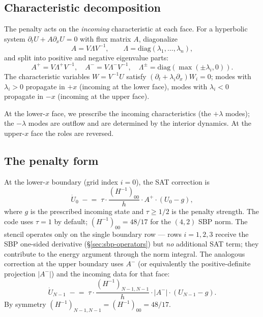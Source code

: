 \documentclass[11pt]{article}
\begin{document}
\subsection{Characteristic decomposition}
\label{sec:characteristics}

The penalty acts on the \emph{incoming} characteristic at each
face.  For a hyperbolic system $\partial_t U + A \partial_x U = 0$
with flux matrix $A$, diagonalize
\[
  A = V \Lambda V^{-1},
  \qquad \Lambda = \mathrm{diag}(\lambda_1, \ldots, \lambda_n),
\]
and split into positive and negative eigenvalue parts:
\[
  A^+ = V \Lambda^+ V^{-1}, \quad
  A^- = V \Lambda^- V^{-1}, \quad
  \Lambda^\pm = \mathrm{diag}(\max(\pm \lambda_i, 0)).
\]
The characteristic variables $W = V^{-1} U$ satisfy
$(\partial_t + \lambda_i \partial_x) W_i = 0$; modes with
$\lambda_i > 0$ propagate in $+x$ (incoming at the lower face),
modes with $\lambda_i < 0$ propagate in $-x$ (incoming at the
upper face).

At the lower-$x$ face, we prescribe the incoming characteristics
(the $+\lambda$ modes); the $-\lambda$ modes are outflow and are
determined by the interior dynamics.  At the upper-$x$ face the
roles are reversed.

\subsection{The penalty form}

At the lower-$x$ boundary (grid index $i = 0$), the SAT correction
is
\begin{equation}
  \dot U_0 \;\mathrel{-}=\;
   \tau \cdot \frac{(H^{-1})_{00}}{h} \cdot A^+ \cdot (U_0 - g),
  \label{eq:sat-lower}
\end{equation}
where $g$ is the prescribed incoming state and $\tau \geq 1/2$ is
the penalty strength.  The code uses $\tau = 1$ by default;
$(H^{-1})_{00} = 48/17$ for the $(4,2)$ SBP norm.  The stencil
operates only on the single boundary row --- rows
$i = 1, 2, 3$ receive the SBP one-sided derivative
(\S\ref{sec:sbp-operators}) but \emph{no} additional SAT term;
they contribute to the energy argument through the norm integral.
The analogous correction at the upper boundary uses $A^-$ (or
equivalently the positive-definite projection $|A^-|$) and the
incoming data for that face:
\begin{equation}
  \dot U_{N-1} \;\mathrel{-}=\;
   \tau \cdot \frac{(H^{-1})_{N-1,N-1}}{h}
   \cdot |A^-| \cdot (U_{N-1} - g).
  \label{eq:sat-upper}
\end{equation}
By symmetry $(H^{-1})_{N-1,N-1} = (H^{-1})_{00} = 48/17$.
\end{document}
